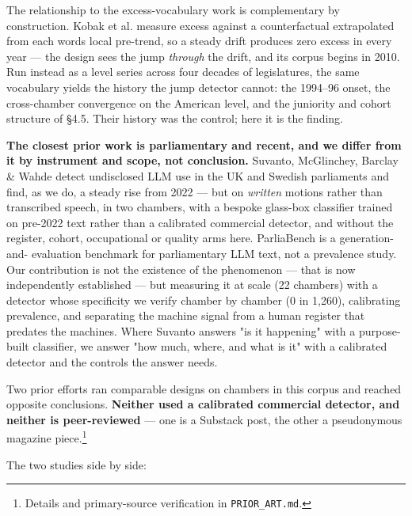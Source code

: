 The relationship to the excess-vocabulary work is complementary by
construction. Kobak et al.\cite{kobak2025} measure excess against a counterfactual
extrapolated from each word\textquotesingle s local pre-trend, so a steady drift produces
zero excess in every year --- the design sees the jump \emph{through} the drift,
and its corpus begins in 2010. Run instead as a level series across four
decades of legislatures, the same vocabulary yields the history the jump
detector cannot: the 1994--96 onset, the cross-chamber convergence on the
American level, and the juniority and cohort structure of §4.5. Their
history was the control; here it is the finding.

\textbf{The closest prior work is parliamentary and recent, and we differ from it
by instrument and scope, not conclusion.} Suvanto, McGlinchey, Barclay \& Wahde\cite{suvanto2026} detect undisclosed LLM use in the UK and Swedish
parliaments and find, as we do, a steady rise from 2022 --- but on \emph{written}
motions rather than transcribed speech, in two chambers, with a bespoke
glass-box classifier trained on pre-2022 text rather than a calibrated
commercial detector, and without the register, cohort, occupational or quality
arms here. ParliaBench\cite{koniaris2026} is a generation-and-
evaluation benchmark for parliamentary LLM text, not a prevalence study. Our
contribution is not the existence of the phenomenon --- that is now independently
established --- but measuring it at scale (22 chambers) with a detector whose
specificity we verify chamber by chamber (0 in 1,260), calibrating prevalence,
and separating the machine signal from a human register that predates the
machines. Where Suvanto answers "is it happening" with a purpose-built
classifier, we answer "how much, where, and what is it" with a calibrated
detector and the controls the answer needs.

Two prior efforts ran comparable designs on chambers in this corpus and
reached opposite conclusions. \textbf{Neither used a calibrated commercial
detector, and neither is peer-reviewed} --- one is a Substack post, the other a
pseudonymous magazine piece.\footnote{Details and primary-source verification in \texttt{PRIOR\_ART.md}.}

The two studies side by side:

